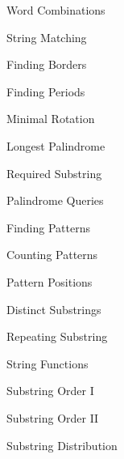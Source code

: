 \begin{practice}
\begin{pplist}
  \item Word Combinations
  \item String Matching
  \item Finding Borders
  \item Finding Periods
  \item Minimal Rotation
  \item Longest Palindrome
  \item Required Substring
  \item Palindrome Queries
  \item Finding Patterns
  \item Counting Patterns
  \item Pattern Positions
  \item Distinct Substrings
  \item Repeating Substring
  \item String Functions
  \item Substring Order I
  \item Substring Order II
  \item Substring Distribution
\end{pplist}
\end{practice}
